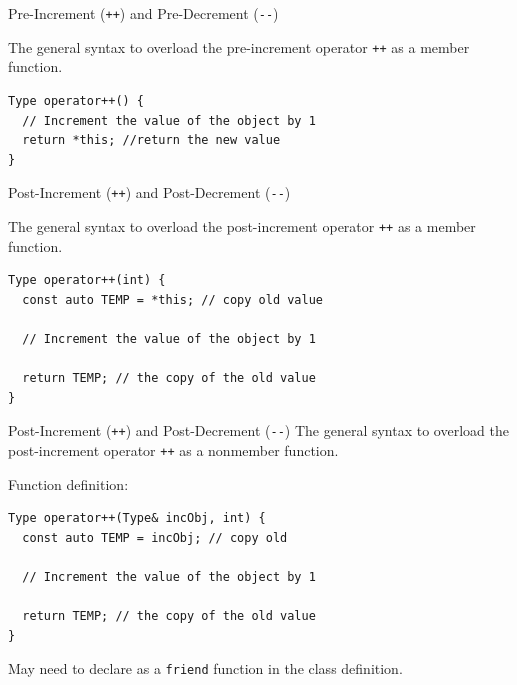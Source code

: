 \documentclass[14pt,aspectratio=1610, hyperref={pdfpagelayout=SinglePage}]{beamer}
\begin{document}
\begin{frame}[fragile]{Pre-Increment (\texttt{++}) and
Pre-Decrement (\texttt{{-}-})}

The general syntax to overload the pre-increment operator \lstinline{++} as a member function.

\begin{lstlisting}
Type operator++() {
  // Increment the value of the object by 1
  return *this; //return the new value
}
\end{lstlisting}
\end{frame}

\begin{frame}[fragile]{Post-Increment (\texttt{++}) and
Post-Decrement (\texttt{{-}-})}

The general syntax to overload the post-increment operator \lstinline{++} as
a member function.

\begin{lstlisting}
Type operator++(int) {
  const auto TEMP = *this; // copy old value

  // Increment the value of the object by 1

  return TEMP; // the copy of the old value
}
\end{lstlisting}
\end{frame}

\begin{frame}[fragile]{Post-Increment (\texttt{++}) and
Post-Decrement (\texttt{{-}-})}
The general syntax to overload the post-increment operator \lstinline{++} as
  a nonmember function.

Function definition:
\begin{lstlisting}
Type operator++(Type& incObj, int) {
  const auto TEMP = incObj; // copy old

  // Increment the value of the object by 1

  return TEMP; // the copy of the old value
}
\end{lstlisting}
May need to declare as a \lstinline{friend} function in the class definition.
\end{frame}
\end{document}
